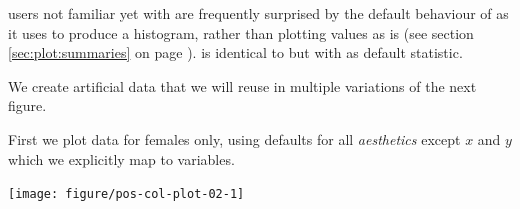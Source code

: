 \documentclass[krantz2]{krantz}\usepackage{knitr}%
\begin{document}
\begin{warningbox}
\Rlang users not familiar yet with \ggplot are frequently surprised by the default behaviour of  as it uses  to produce a histogram, rather than plotting values as is (see section \ref{sec:plot:summaries} on page \pageref{sec:plot:summaries}).  is identical to  but with  as default statistic.
\end{warningbox}

We create artificial data that we will reuse in multiple variations of the next figure.

\begin{knitrout}\footnotesize
{}\color{fgcolor}\begin{kframe}
\begin{alltt}
\hlstd{(}\hlstd{)}
 \hlkwb{<-} \hlstd{(} \hlstd{=} \hlstd{(}\hlstd{(}\hlstd{(}\hlstd{,} \hlstd{,} \hlstd{),} \hlstd{)),}
                           \hlstd{=} \hlstd{(}\hlstd{(}\hlstd{(}\hlstd{,} \hlstd{),} \hlstd{(}\hlstd{,} \hlstd{))),}
                           \hlstd{=} \hlstd{(}\hlstd{)} \hlopt{+} \hlstd{(}\hlstd{,} \hlstd{,} \hlstd{))}
\end{alltt}
\end{kframe}
\end{knitrout}

First we plot data for females only, using defaults for all \emph{aesthetics} except $x$ and $y$ which we explicitly map to variables.

\begin{knitrout}\footnotesize
{}\color{fgcolor}\begin{kframe}
\begin{alltt}
\hlstd{(} \hlopt{==} \hlstd{),}
       \hlstd{(}    \hlopt{+}
   \hlstd{()}
\end{alltt}
\end{kframe}

{\centering \texttt{[image: figure/pos-col-plot-02-1]} 

}



\end{knitrout}
\end{document}
